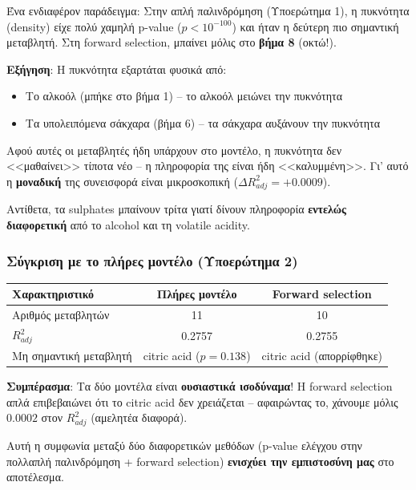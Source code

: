 \documentclass[12pt,a4paper]{article}
\begin{document}
\begin{warningbox}
Ένα ενδιαφέρον παράδειγμα: Στην απλή παλινδρόμηση (Υποερώτημα 1), η πυκνότητα (density) είχε πολύ χαμηλή p-value ($p < 10^{-100}$) και ήταν η δεύτερη πιο σημαντική μεταβλητή. Στη forward selection, μπαίνει μόλις στο \textbf{βήμα 8} (οκτώ!).

\textbf{Εξήγηση}: Η πυκνότητα εξαρτάται φυσικά από:
\begin{itemize}
    \item Το αλκοόλ (μπήκε στο βήμα 1) -- το αλκοόλ μειώνει την πυκνότητα
    \item Τα υπολειπόμενα σάκχαρα (βήμα 6) -- τα σάκχαρα αυξάνουν την πυκνότητα
\end{itemize}
Αφού αυτές οι μεταβλητές ήδη υπάρχουν στο μοντέλο, η πυκνότητα δεν <<μαθαίνει>> τίποτα νέο -- η πληροφορία της είναι ήδη <<καλυμμένη>>. Γι' αυτό η \textbf{μοναδική} της συνεισφορά είναι μικροσκοπική ($\Delta R^2_{adj} = +0.0009$).

Αντίθετα, τα sulphates μπαίνουν τρίτα γιατί δίνουν πληροφορία \textbf{εντελώς διαφορετική} από το alcohol και τη volatile acidity.
\end{warningbox}

\subsubsection{Σύγκριση με το πλήρες μοντέλο (Υποερώτημα 2)}

\begin{theorybox}
\begin{center}
\begin{tabular}{lcc}
\toprule
\textbf{Χαρακτηριστικό} & \textbf{Πλήρες μοντέλο} & \textbf{Forward selection} \\
\midrule
Αριθμός μεταβλητών & 11 & 10 \\
$R^2_{adj}$ & 0.2757 & 0.2755 \\
Μη σημαντική μεταβλητή & citric acid ($p=0.138$) & citric acid (απορρίφθηκε) \\
\bottomrule
\end{tabular}
\end{center}

\textbf{Συμπέρασμα}: Τα δύο μοντέλα είναι \textbf{ουσιαστικά ισοδύναμα}! Η forward selection απλά επιβεβαιώνει ότι το citric acid δεν χρειάζεται -- αφαιρώντας το, χάνουμε μόλις $0.0002$ στον $R^2_{adj}$ (αμελητέα διαφορά).

Αυτή η συμφωνία μεταξύ δύο διαφορετικών μεθόδων (p-value ελέγχου στην πολλαπλή παλινδρόμηση + forward selection) \textbf{ενισχύει την εμπιστοσύνη μας} στο αποτέλεσμα.
\end{theorybox}
\end{document}
